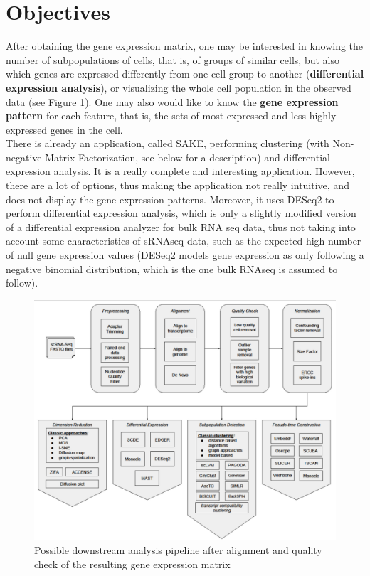 \documentclass{report}
\begin{document}
{\section{Objectives}

After obtaining the gene expression matrix, one may be interested in knowing the number of subpopulations of cells, that is, of groups of similar cells, but also which genes are expressed differently from one cell group to another (\textbf{differential expression analysis}), or visualizing the whole cell population in the observed data (see Figure \ref{pipeline}). One may also would like to know the \textbf{gene expression pattern} for each feature, that is, the sets of most expressed and less highly expressed genes in the cell.\\

There is already an application, called SAKE\cite{sake}, performing clustering (with Non-negative Matrix Factorization, see below for a description) and differential expression analysis. It is a really complete and interesting application. However, there are a lot of options, thus making the application not really intuitive, and does not display the gene expression patterns. Moreover, it uses DESeq2\cite{love2014moderated} to perform differential expression analysis, which is only a slightly modified version of a differential expression analyzer\cite{anders2010differential} for bulk RNA seq data, thus not taking into account some characteristics of sRNAseq data, such as the expected high number of null gene expression values (DESeq2 models gene expression as only following a negative binomial distribution, which is the one bulk RNAseq is assumed to follow).

\begin{figure}[H]
\centering
\includegraphics[scale=0.3]{illustrations/pipelinedownstream.png}
\caption{Possible downstream analysis pipeline after alignment and quality check of the resulting gene expression matrix\cite{poirion2016single}}
\label{pipeline}
\end{figure}

}
\end{document}
